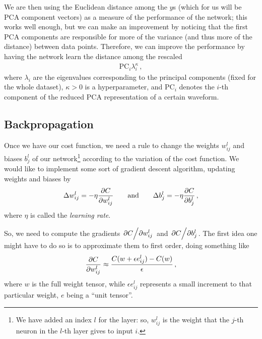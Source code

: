 \documentclass[main.tex]{subfiles}
\begin{document}
We are then using the Euclidean distance among the \(y\)s (which for us will be \ac{PCA} component vectors) as a measure of the performance of the network; this works well enough, but we can make an improvement by noticing that the first PCA components are responsible for more of the variance (and thus more of the distance) between data points. 
Therefore, we can improve the performance by having the network learn the distance among the rescaled 
%
\begin{align}
\text{PC}_i \lambda_i^{\kappa }
\,,
\end{align}
%
where \(\lambda _i\) are the eigenvalues corresponding to the principal components (fixed for the whole dataset), \(\kappa > 0\) is a hyperparameter, and \(\text{PC}_i\) denotes the \(i\)-th component of the reduced \ac{PCA} representation of a certain waveform.

\subsection{Backpropagation}

Once we have our cost function, we need a rule to change the weights \(w_{ij}^{l}\) and biases \(b_{j}^{l}\) of our network\footnote{We have added an index \(l\) for the layer: so, \(w_{ij}^{l}\) is the weight that the \(j\)-th neuron in the \(l\)-th layer gives to input \(i\).} according to the variation of the cost function. 
We would like to implement some sort of gradient descent algorithm, updating weights and biases by
%
\begin{align} \label{eq:gradient-descent-basic}
\Delta w_{ij}^{l} = - \eta \pdv{C}{w_{ij}^{l}} 
\qquad \text{and} \qquad
\Delta b_{j}^{l} = - \eta \pdv{C}{b_{j}^{l}}
\,,
\end{align}
%
where \(\eta \) is called the \emph{learning rate}. 

So, we need to compute the gradients \(\pdv*{C}{w_{ij}^{l}}\) and \(\pdv*{C}{b_{j}^{l}}\). 
The first idea one might have to do so is to approximate them to first order, doing something like 
%
\begin{align}
\pdv{C}{w_{ij}^{l}} \approx \frac{C(w + \epsilon e_{ij}^{l}) - C (w)}{\epsilon }
\,,
\end{align}
%
where \(w\) is the full weight tensor, while \(\epsilon e_{ij}^{l}\) represents a small increment to that particular weight, \(e\) being a ``unit tensor''.
\end{document}
